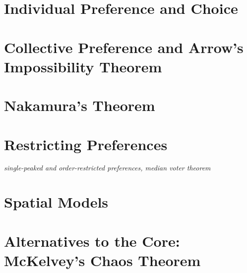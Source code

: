 \documentclass[../../../main.tex]{subfiles}
\begin{document}

\section{Individual Preference and Choice}
\section{Collective Preference and Arrow's Impossibility Theorem}
\section{Nakamura's Theorem}
\section{Restricting Preferences}
\textit{single-peaked and order-restricted preferences, median voter theorem}
\section{Spatial Models}
\section{Alternatives to the Core: McKelvey's Chaos Theorem}

\printbibliography[
    heading=subbibintoc,
    title={References}
]
\end{document}
